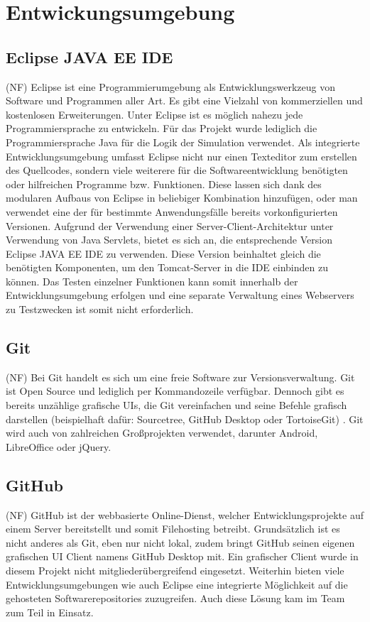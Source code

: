\clearpage
\chapter{Entwickungsumgebung}
\section{Eclipse JAVA EE IDE}
(NF) Eclipse ist eine Programmierumgebung als Entwicklungswerkzeug von Software und Programmen aller Art. Es gibt eine Vielzahl von kommerziellen und kostenlosen Erweiterungen. Unter Eclipse ist es möglich nahezu jede Programmiersprache zu entwickeln. Für das Projekt wurde lediglich die Programmiersprache Java für die Logik der Simulation verwendet. Als integrierte Entwicklungsumgebung umfasst Eclipse nicht nur einen Texteditor zum erstellen des Quellcodes, sondern viele weiterere für die Softwareentwicklung benötigten oder hilfreichen Programme bzw. Funktionen. Diese lassen sich dank des modularen Aufbaus von Eclipse in beliebiger Kombination hinzufügen, oder man verwendet eine der für bestimmte Anwendungsfälle bereits vorkonfigurierten Versionen. Aufgrund der Verwendung einer Server-Client-Architektur unter Verwendung von Java Servlets, bietet es sich an, die entsprechende Version Eclipse JAVA EE IDE zu verwenden. Diese Version beinhaltet gleich die benötigten Komponenten, um den Tomcat-Server in die IDE einbinden zu können. Das Testen einzelner Funktionen kann somit innerhalb der Entwicklungsumgebung erfolgen und eine separate Verwaltung eines Webservers zu Testzwecken ist somit nicht erforderlich.
\section{Git}
(NF) Bei Git handelt es sich um eine freie Software zur Versionsverwaltung. Git ist Open Source und lediglich per Kommandozeile verfügbar. Dennoch gibt es bereits unzählige grafische UIs, die Git vereinfachen und seine Befehle grafisch darstellen (beispielhaft dafür: Sourcetree, GitHub Desktop oder TortoiseGit) . Git wird auch von zahlreichen Großprojekten verwendet, darunter Android, LibreOffice oder jQuery. 
\section{GitHub}
(NF) GitHub ist der webbasierte Online-Dienst, welcher Entwicklungsprojekte auf einem Server bereitstellt und somit Filehosting betreibt. Grundsätzlich ist es nicht anderes als Git, eben nur nicht lokal, zudem bringt GitHub seinen eigenen grafischen UI Client namens GitHub Desktop mit. Ein grafischer Client wurde in diesem Projekt nicht mitgliederübergreifend eingesetzt. Weiterhin bieten viele Entwicklungsumgebungen wie auch Eclipse eine integrierte Möglichkeit auf die gehosteten Softwarerepositories zuzugreifen. Auch diese Lösung kam im Team zum Teil in Einsatz.
